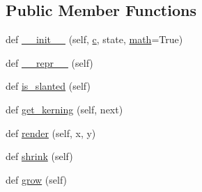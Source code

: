 \subsection*{Public Member Functions}
\begin{DoxyCompactItemize}
\item 
def \hyperlink{classmatplotlib_1_1__mathtext_1_1Char_a0e6f39df55b00796d3b7bc25c8b4aa45}{\+\_\+\+\_\+init\+\_\+\+\_\+} (self, \hyperlink{classmatplotlib_1_1__mathtext_1_1Char_ad0a96d779582655d1806dbfdee8756ae}{c}, state, \hyperlink{classmatplotlib_1_1__mathtext_1_1Char_ac128837857ae5dbf517edcf098bba4d4}{math}=True)
\item 
def \hyperlink{classmatplotlib_1_1__mathtext_1_1Char_ad8c424fce47d4127709080f753d1ec77}{\+\_\+\+\_\+repr\+\_\+\+\_\+} (self)
\item 
def \hyperlink{classmatplotlib_1_1__mathtext_1_1Char_a75cc34f928a57081fbf275fa1f3ae3b3}{is\+\_\+slanted} (self)
\item 
def \hyperlink{classmatplotlib_1_1__mathtext_1_1Char_a1fb407b2561825bfb4a06c1a126d1d5c}{get\+\_\+kerning} (self, next)
\item 
def \hyperlink{classmatplotlib_1_1__mathtext_1_1Char_ad913a0c543de4d5d182afc5fe882f2ff}{render} (self, x, y)
\item 
def \hyperlink{classmatplotlib_1_1__mathtext_1_1Char_a209478846ef8627c3f528df741c5924a}{shrink} (self)
\item 
def \hyperlink{classmatplotlib_1_1__mathtext_1_1Char_ab3a23132187a61fcb1b1f3c5106f4ef0}{grow} (self)
\end{DoxyCompactItemize}
